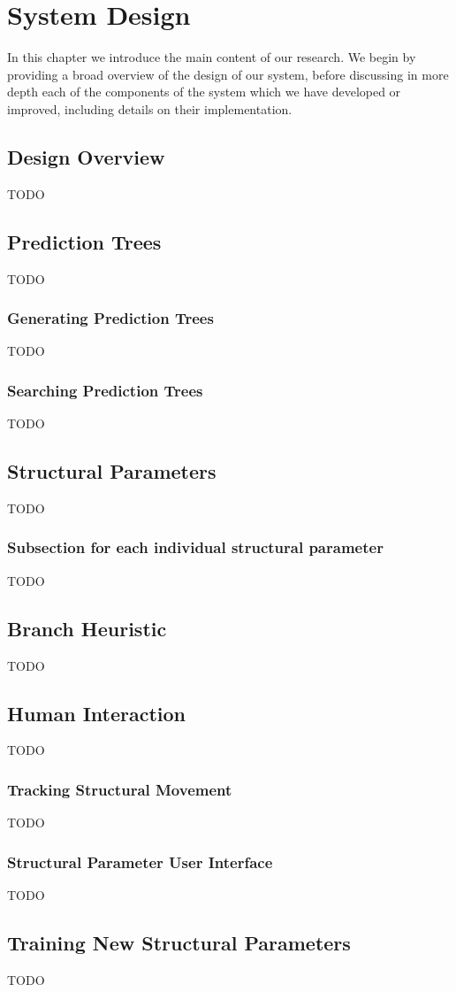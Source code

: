 \chapter{System Design}\label{chap:systemDesign}

In this chapter we introduce the main content of our research. We begin by providing a broad overview of the design of our system, before discussing in more depth each of the components of the system which we have developed or improved, including details on their implementation. 

\section{Design Overview}
TODO

\section{Prediction Trees}
TODO

\subsection{Generating Prediction Trees}
TODO

\subsection{Searching Prediction Trees}
TODO

\section{Structural Parameters}
TODO

\subsection{Subsection for each individual structural parameter}
TODO

\section{Branch Heuristic}
TODO

\section{Human Interaction}
TODO

\subsection{Tracking Structural Movement}
TODO

\subsection{Structural Parameter User Interface}
TODO

\section{Training New Structural Parameters}
TODO



